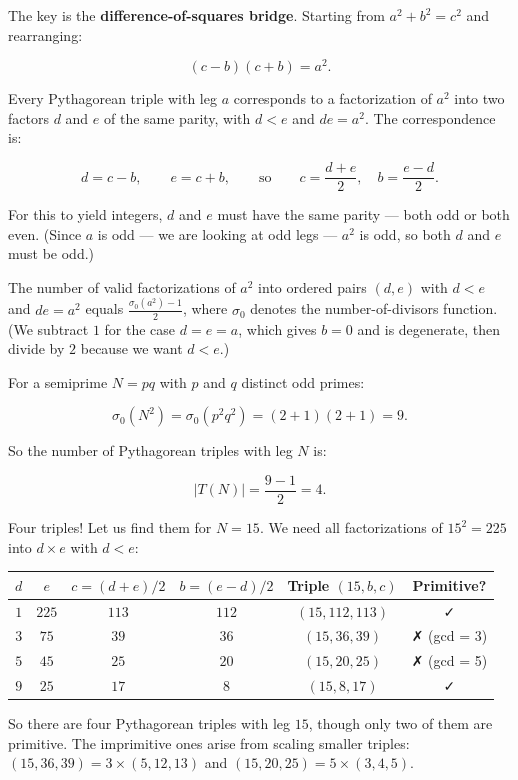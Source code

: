The key is the \textbf{difference-of-squares bridge}. Starting from $a^2 + b^2 = c^2$ and rearranging:

\[
(c - b)(c + b) = a^2.
\]

Every Pythagorean triple with leg $a$ corresponds to a factorization of $a^2$ into two factors $d$ and $e$ of the same parity, with $d < e$ and $de = a^2$. The correspondence is:

\[
d = c - b, \qquad e = c + b, \qquad \text{so} \qquad c = \frac{d + e}{2}, \quad b = \frac{e - d}{2}.
\]

For this to yield integers, $d$ and $e$ must have the same parity --- both odd or both even. (Since $a$ is odd --- we are looking at odd legs --- $a^2$ is odd, so both $d$ and $e$ must be odd.)

The number of valid factorizations of $a^2$ into ordered pairs $(d, e)$ with $d < e$ and $de = a^2$ equals $\frac{\sigma_0(a^2) - 1}{2}$, where $\sigma_0$ denotes the number-of-divisors function. (We subtract $1$ for the case $d = e = a$, which gives $b = 0$ and is degenerate, then divide by $2$ because we want $d < e$.)

For a semiprime $N = pq$ with $p$ and $q$ distinct odd primes:

\[
\sigma_0(N^2) = \sigma_0(p^2 q^2) = (2 + 1)(2 + 1) = 9.
\]

So the number of Pythagorean triples with leg $N$ is:

\[
|T(N)| = \frac{9 - 1}{2} = 4.
\]

Four triples! Let us find them for $N = 15$. We need all factorizations of $15^2 = 225$ into $d \times e$ with $d < e$:

\begin{center}
\small
\begin{tabular}{c c c c c c}
\toprule
$d$ & $e$ & $c = (d+e)/2$ & $b = (e-d)/2$ & Triple $(15, b, c)$ & Primitive? \\
\midrule
$1$ & $225$ & $113$ & $112$ & $(15, 112, 113)$ & ✓ \\
$3$ & $75$ & $39$ & $36$ & $(15, 36, 39)$ & ✗ (gcd = 3) \\
$5$ & $45$ & $25$ & $20$ & $(15, 20, 25)$ & ✗ (gcd = 5) \\
$9$ & $25$ & $17$ & $8$ & $(15, 8, 17)$ & ✓ \\
\bottomrule
\end{tabular}
\end{center}

So there are four Pythagorean triples with leg $15$, though only two of them are primitive. The imprimitive ones arise from scaling smaller triples: $(15, 36, 39) = 3 \times (5, 12, 13)$ and $(15, 20, 25) = 5 \times (3, 4, 5)$.


